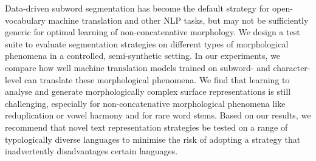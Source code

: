 Data-driven subword segmentation has become the default strategy for open-vocabulary machine translation and other NLP tasks, but may not be sufficiently generic for optimal learning of non-concatenative morphology. We design a test suite to evaluate segmentation strategies on different types of morphological phenomena in a controlled, semi-synthetic setting. In our experiments, we compare how well machine translation models trained on subword- and character-level can translate these morphological phenomena. We find that learning to analyse and generate morphologically complex surface representations is still challenging, especially for non-concatenative morphological phenomena like reduplication or vowel harmony and for rare word stems. Based on our results, we recommend that novel text representation strategies be tested on a range of typologically diverse languages to minimise the risk of adopting a strategy that inadvertently disadvantages certain languages.
